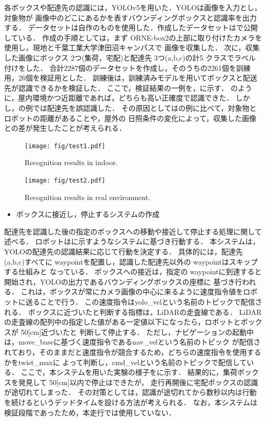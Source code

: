 \documentclass[twocolumn, 9pt]{jsproceedings}
\begin{document}
各ボックスや配達先の認識には，YOLOv5\cite{yolo}を用いた．YOLOは画像を入力とし，対象物が
画像中のどこにあるかを表すバウンディングボックスと認識率を出力する．
データセットは自作のものを使用した．作成したデータセットは\cite{nagashima}で公開している．
作成の手順としては，まず ORNE-box2の上部に取り付けたカメラを使用し，現地と千葉工業大学津田沼キャンパスで
画像を収集した．
次に，収集した画像にボックス 2つ(集荷，宅配)と配達先 3つ(a,b,c)の計5 クラスでラベル付けをした．
合計2287個のデータセットを作成し，そのうちの2261個を訓練用，26個を検証用とした．
訓練後は，訓練済みモデルを用いてボックスと配送先が認識できるかを検証した．
ここで，検証結果の一例を，に示す．
のように，屋内環境かつ近距離であれば，どちらも高い正確度で認識できた．
しかし，の例では配達先を誤認識した．
その原因としてはの例に比べて，対象物とロボットの距離があることや，屋外の
日照条件の変化によって，収集した画像との差が発生したことが考えられる．

\begin{figure}[h!]
  \centering
  \texttt{[image: fig/test1.pdf]}
  \caption{Recognition results in indoor.}
  \label{fig:test1}
\end{figure}

\begin{figure}[h!]
  \centering
  \texttt{[image: fig/test2.pdf]}
  \caption{Recognition results in real environment.}
  \label{fig:test2}
\end{figure}

\begin{itemize}
  \setlength{\leftskip}{-1zw}
  \item ボックスに接近し，停止するシステムの作成
\end{itemize}
\vspace*{-2.5mm}

配達先を認識した後の指定のボックスへの移動や接近して停止する処理に関して述べる．
ロボットはに示すようなシステムに基づき行動する．
本システムは，YOLOの配達先の認識結果に応じて行動を決定する．
具体的には，配達先(a,b,c)すべてに waypointを配置し，認識した配達先以外の waypointはスキップする仕組みと
なっている．
ボックスへの接近は，指定の waypointに到達すると開始され，YOLOの出力であるバウンディングボックスの座標に
基づき行われる．
これは，ボックスが常にカメラ画像の中心に来るように速度指令値をロボットに送ることで行う．
この速度指令はyolo\_velという名前のトピックで配信される．
ボックスに近づいたと判断する指標は，LiDARの走査線である．
LiDARの走査線の配列中の指定した値がある一定値以下になったら，ロボットとボックスが 50[cm]近づいたと
判断して停止する．
ただし，ナビゲーションの起動中は，move\_baseに基づく速度指令であるnav\_velという名前のトピック
が配信されており，そのままだと速度指令が競合するため，どちらの速度指令を使用するかをtwist\_muxに
よって判断し，cmd\_velという名前のトピックで配信している．
ここで，本システムを用いた実験の様子をに示す．
結果的に，集荷ボックスを発見して 50[cm]以内で停止はできたが，
走行再開後に宅配ボックスの認識が途切れてしまった．
その対策としては，認識が途切れてから数秒以内は行動を続けるというデッドタイムを設ける方法が考えられる．
なお，本システムは検証段階であったため，本走行では使用していない．
\end{document}
